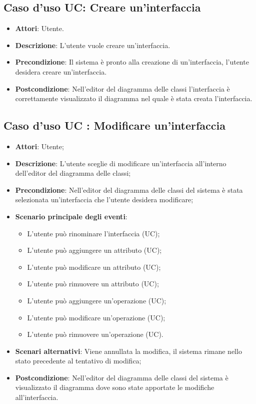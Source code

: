\documentclass[../AnalisiDeiRequisiti.tex]{subfiles}
\begin{document}
		
		\subsection{Caso d'uso UC: Creare un'interfaccia}
		\begin{itemize}
			\item\textbf{Attori}: Utente.
			\item\textbf{Descrizione}: L'utente vuole creare un'interfaccia.
			\item\textbf{Precondizione}: Il sistema è pronto alla creazione di un'interfaccia, l'utente desidera creare un'interfaccia.
			\item\textbf{Postcondizione}: Nell'editor del diagramma delle classi l'interfaccia è correttamente visualizzato il diagramma nel quale è stata creata l'interfaccia.
		\end{itemize}
			
				
		\subsection{Caso d'uso UC : Modificare un'interfaccia}
			\begin{itemize}
				\item \textbf{Attori}: Utente;
				\item \textbf{Descrizione}: L'utente sceglie di modificare un'interfaccia
				all'interno dell'editor del diagramma delle classi;
				\item \textbf{Precondizione}: Nell'editor del diagramma delle classi del
				sistema è stata selezionata un'interfaccia che l'utente desidera modificare;
				\item \textbf{Scenario principale degli eventi}:
					\begin{itemize}
						\item L'utente può rinominare l'interfaccia (UC);
						\item L'utente può aggiungere un attributo (UC);
						\item L'utente può modificare un attributo (UC);
						\item L'utente può rimuovere un attributo (UC);
						\item L'utente può aggiungere un'operazione (UC);
						\item L'utente può modificare un'operazione (UC);
						\item L'utente può rimuovere un'operazione (UC).
					\end{itemize}
				\item \textbf{Scenari alternativi}: Viene annullata la modifica, il sistema
				rimane nello stato precedente al tentativo di modifica;
				\item \textbf{Postcondizione}: Nell'editor del diagramma delle classi del
				sistema è visualizzato il diagramma dove sono state apportate le modifiche
				all'interfaccia.
			\end{itemize}
\end{document}
